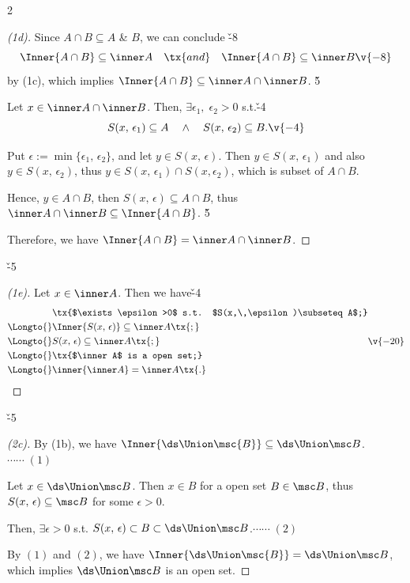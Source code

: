 \documentclass[dvipdfmx,a4paper,titlepage,9pt]{jsarticle}
\begin{document}
\begin{multicols*}{2}
\begin{itemize}[label=-]
\vfill\null\columnbreak

\begin{pfbox}[]
\begin{proof}[(1d)]
Since $A\cap B\subseteq A$ \& $B$, we can conclude \v{-8}
$$\Inner{A\cap B}\subseteq \inner A\quad\tx{and}\quad\Inner{A\cap B}\subseteq \inner B\v{-8}$$
by (1c), which implies $\Inner{A\cap B}\subseteq\inner A\cap\inner B$. \v5

Let $x\in\inner A\cap\inner B$. Then, $\exists\epsilon_1,\;\epsilon_2>0$ s.t.\v{-4}
$$S(x,\,\epsilon_1)\subseteq A\quad\wedge\quad S(x,\,\epsilon_2)\subseteq B.\v{-4}$$

Put $\epsilon:=\min{}\{\epsilon_1,\,\epsilon_2\}$, and let $y\in S(x,\,\epsilon)$. Then $y\in S(x,\,\epsilon_1)$ and also $y\in S(x,\,\epsilon_2)$, thus $y\in S(x,\,\epsilon_1)\cap S(x,\epsilon_2)$, which is subset of $A\cap B$.

Hence, $y\in A\cap B$, then $S(x,\,\epsilon)\subseteq A\cap B$, thus $\inner A\cap\inner B\subseteq\Inner{A\cap B}$. \v5

Therefore, we have $\Inner{A\cap B}=\inner A\cap\inner B$.
\end{proof}\v{-5}
\dotfill
\begin{proof}[(1e)]
Let $x\in\inner A$. Then we have\v{-4}
$$\begin{aligned}
            & \tx{$\exists\epsilon>0$ s.t. $S(x,\,\epsilon)\subseteq A$;} \\
  \Longto{} & \Inner{S(x,\,\epsilon)}\subseteq\inner A\tx{;} \\
  \Longto{} & S(x,\,\epsilon)\subseteq\inner A\tx{;} \\
  \Longto{} & \tx{$\inner A$ is a open set;} \\
  \Longto{} & \inner{\inner A}=\inner A\tx{.}
  \end{aligned}\v{-20}$$
\end{proof}\v{-5}
\dotfill
\begin{proof}[(2c)]
By (1b), we have $\Inner{\ds\Union\msc{B}}\subseteq\ds\Union\msc B$.\hfill$\cdots\cdots\;(1)$

Let $x\in\ds\Union\msc B$. Then $x\in B$ for a open set $B\in\msc B$, thus $S(x,\,\epsilon)\subseteq\msc B$ for some $\epsilon>0$.

Then, $\exists\epsilon>0$ s.t. $S(x,\,\epsilon)\subset B\subset\ds\Union\msc B$.\hfill$\cdots\cdots\;(2)$

By $(1)$ and $(2)$, we have $\Inner{\ds\Union\msc{B}}=\ds\Union\msc B$, \\
which implies $\ds\Union\msc B$ is an open set.
\end{proof}
\end{pfbox}


\end{itemize}
\end{multicols*}
\end{document}

